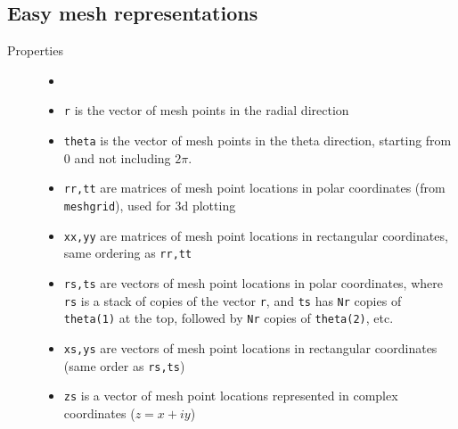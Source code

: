 \subsection{Easy mesh representations}
\label{sec-scattResComp2d-mesh}

\begin{description}
 \item[Properties]
   \begin{itemize}  
    \item[] %
    \item {\tt r} is the vector of mesh points in the radial direction
    \item {\tt theta} is the vector of mesh points in the theta direction,
          starting from 0 and not including $2\pi$.
    \item {\tt rr,tt} are matrices of mesh point locations in 
          polar coordinates (from {\tt meshgrid}), used for 3d plotting
    \item {\tt xx,yy} are matrices of mesh point locations in rectangular
          coordinates, same ordering as {\tt rr,tt}
    \item {\tt rs,ts} are vectors of mesh point locations in
          polar coordinates, where {\tt rs} is a stack of copies of the
          vector {\tt r},
          and {\tt ts} has {\tt Nr} copies of {\tt theta(1)} at the top,
          followed by {\tt Nr} copies of {\tt theta(2)}, etc.
    \item {\tt xs,ys} are vectors of mesh point locations in
          rectangular coordinates (same order as {\tt rs,ts})
    \item {\tt zs} is a vector of mesh point locations represented
          in complex coordinates ($z = x + iy$)
   \end{itemize}


\end{description}

